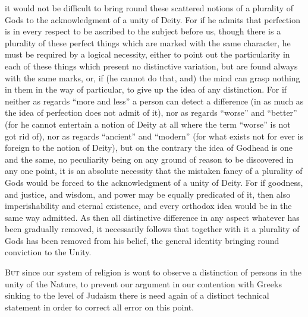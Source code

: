it would not be difficult to bring round these scattered notions of a plurality of Gods to the acknowledgment of a unity of Deity. For if he admits that perfection is in every respect to be ascribed to the subject before us, though there is a plurality of these perfect things which are marked with the same character, he must be required by a logical necessity, either to point out the particularity in each of these things which present no distinctive variation, but are found always with the same marks, or, if (he cannot do that, and) the mind can grasp nothing in them in the way of particular, to give up the idea of any distinction. For if neither as regards “more and less” a person can detect a difference (in as much as the idea of perfection does not admit of it), nor as regards “worse” and “better” (for he cannot entertain a notion of Deity at all where the term “worse” is not got rid of), nor as regards “ancient” and “modern” (for what exists not for ever is foreign to the notion of Deity), but on the contrary the idea of Godhead is one and the same, no peculiarity being on any ground of reason to be discovered in any one point, it is an absolute necessity that the mistaken fancy of a plurality of Gods would be forced to the acknowledgment of a unity of Deity. For if goodness, and justice, and wisdom, and power may be equally predicated of it, then also imperishability and eternal existence, and every orthodox idea would be in the same way admitted. As then all distinctive difference in any aspect whatever has been gradually removed, it necessarily follows that together with it a plurality of Gods has been removed from his belief, the general identity bringing round conviction to the Unity.


\textsc{But} since our system of religion is wont to observe a distinction of persons in the unity of the Nature, to prevent our argument in our contention with Greeks sinking to the level of Judaism there is need again of a distinct technical statement in order to correct all error on this point.

